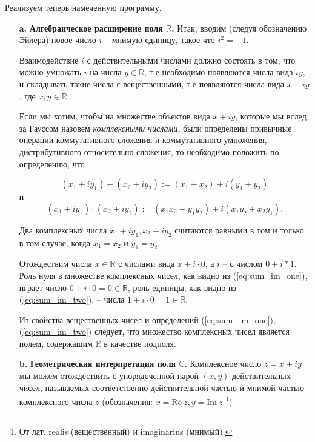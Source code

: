 \documentclass[a4paper, 12pt]{article} %
\begin{document}
Реализуем теперь намеченную программу.
\begin{enumerate}
    \item [\textbf{a.}] \textbf{Алгебраическое расширение поля $\mathbb{R}$.} Итак, вводим (следуя обозначению Эйлера) новое число $i$ -- мнимую единицу, такое что $i^2 = -1$.

          Взаимодействие $i$ с действительными числами должно состоять в том, что можно умножать $i$ на числа $y \in \mathbb{R}$, т.е необходимо появляются числа вида $iy$, и складывать такие числа с вещественными, т.е появляются числа вида $x + iy$, где $x, y \in \mathbb{R}$.

          Если мы хотим, чтобы на множестве объектов вида $x + iy$, которые мы вслед за Гауссом назовем \textit{компле$\acute{}$ксными числами}, были определены привычные операции коммутативного сложения и коммутативного умножения, дистрибутивного относительно сложения, то необходимо положить по определению, что

          \begin{equation}
              (x_1 + iy_1) + (x_2 + iy_2) := (x_1 + x_2) + i(y_1 + y_2)
              \label{eq:sum_im_one}
          \end{equation}
          и
          \begin{equation}
              (x_1 + iy_1) \cdot (x_2 + iy_2) := (x_1 x_2 - y_1 y_2) + i(x_1 y_2 + x_2 y_1).
              \label{eq:sum_im_two}
          \end{equation}

          Два комплексных числа $x_1 + iy_1, x_2 + iy_2$ считаются равными в том и только в том случае, когда $x_1 = x_2$ и $y_1 = y_2$.

          Отождествим числа $x \in \mathbb{R}$ с числами вида $x + i \cdot 0$, а $i$ -- с числом $0 + i * 1$. Роль нуля в множестве комплексных чисел, как видно из (\ref{eq:sum_im_one}), играет число $0 + i \cdot 0 = 0 \in \mathbb{R}$, роль единицы, как видно из (\ref{eq:sum_im_two}), -- числа $1 + i \cdot 0 = 1 \in \mathbb{R}$.

          Из свойства вещественных чисел и определений (\ref{eq:sum_im_one}), (\ref{eq:sum_im_two}) следует, что множество комплексных чисел является полем, содержащим $\mathbb{R}$ в качестве подполя.

    \item [\textbf{b.}] \textbf{Геометрическая интерпретация поля $\mathbb{C}$}. Комплексное число $z = x + iy$ мы можем отождествить с упорядоченной парой $(x, y)$ действительных чисел, называемых соответственно действительной частью и мнимой частью компле$\acute{}$ксного числа $z$ (обозначения: $x = \mathrm{Re} \ z, y = \mathrm{Im} \ z$ \footnote{От лат. realis (вещественный) и imaginarius (мнимый).})


\end{enumerate}
\end{document}
